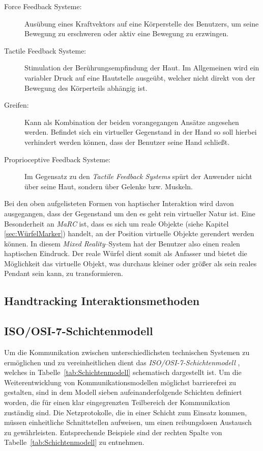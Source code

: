 \begin{description}
	\item[Force Feedback Systeme:] Ausübung eines Kraftvektors auf eine Körperstelle des Benutzers, um seine Bewegung zu erschweren oder aktiv eine Bewegung zu erzwingen. %
	\item[Tactile Feedback Systeme:] Stimulation der Berührungsempfindung der Haut. Im Allgemeinen wird ein variabler Druck auf eine Hautstelle ausgeübt, welcher nicht direkt von der Bewegung des Körperteils abhängig ist.
	\item[Greifen:] Kann als Kombination der beiden vorangegangen Ansätze angesehen werden. Befindet sich ein virtueller Gegenstand in der Hand so soll hierbei verhindert werden können, dass der Benutzer seine Hand schließt. 
	\item[Proprioceptive Feedback Systeme:] Im Gegensatz zu den \textit{Tactile Feedback Systems} spürt der Anwender nicht über seine Haut, sondern über Gelenke bzw. Muskeln. 
\end{description}

Bei den oben aufgelisteten Formen von haptischer Interaktion wird davon ausgegangen, dass der Gegenstand um den es geht rein virtueller Natur ist. Eine Besonderheit an \textit{MaRC} ist, dass es sich um reale Objekte (siehe Kapitel \ref{sec:WürfelMarker}) handelt, an der Position virtuelle Objekte gerendert werden können. In diesem \textit{Mixed Reality}--System hat der Benutzer also einen realen haptischen Eindruck. Der reale Würfel dient somit als Anfasser und bietet die Möglichkeit das virtuelle Objekt, was durchaus kleiner oder größer als sein reales Pendant sein kann, zu transformieren. 



\subsection{Handtracking Interaktionsmethoden}\label{sec:HandtrackingAnwendungen}
\subsection{ISO/OSI-7-Schichtenmodell}\label{sec:Netzwerk}
Um die Kommunikation zwischen unterschiedlichsten technischen Systemen zu ermöglichen und zu vereinheitlichen dient das \textit{ISO/OSI-7-Schichtenmodell} \cite{ITU}, welches in Tabelle~\ref{tab:Schichtenmodell} schematisch dargestellt ist. Um die Weiterentwicklung von Kommunikationsmodellen möglichst barrierefrei zu gestalten, sind in dem Modell sieben aufeinanderfolgende Schichten definiert worden, die für einen klar eingegrenzten Teilbereich der Kommunikation zuständig sind. Die Netzprotokolle, die in einer Schicht zum Einsatz kommen, müssen einheitliche Schnittstellen aufweisen, um einen reibungslosen Austausch zu gewährleisten. Entsprechende Beispiele sind der rechten Spalte von Tabelle~\ref{tab:Schichtenmodell} zu entnehmen.\\

